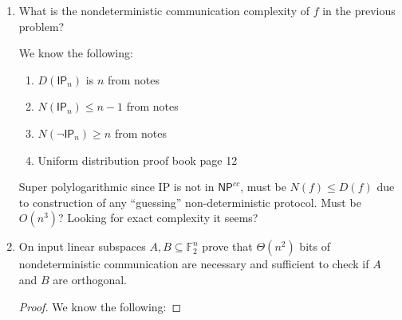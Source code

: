 \documentclass[usletter]{article}
\begin{document}
\begin{enumerate}
    \begin{proof}
      We know the following:

      \begin{enumerate}
        \item $M_{\mathsf{IP}_n} = \left [ \sum_{i=1}^{n} x_i y_i \right ]$ in $\mathbb{F}_2$
        \item $rk_{\mathbb{F}_2}\ M_{\mathsf{IP}_n} = n$
        \item $\forall \mathbb{F}, \mathbb{K}, rk_{\mathbb{F}}\ M = rk_{\mathbb{K}}\ M$ where $\mathbb{F}, \mathbb{K}$ are finite fields.
        \item $\forall \mathbb{F}, f.|fs(f)| \leq (1 + rk_{\mathbb{F}}\ M_f)^2$ where $M_f$ is the characteristic matrix for $f$.
      \end{enumerate}

      From the definition and (a) $f$ has can be seen as $\left [ \sum_{i=1}^{n} x_i y_i \right ]$ in $\mathbb{F}_{18181}$. Then by (b) and (c) we know that $M_f$ has rank $n$ and taken with (d) this implies that the size of the fooling set is certainly no greater than $n^3$.
    \end{proof}

  \item What is the nondeterministic communication complexity of $f$ in the previous problem?

    We know the following:

    \begin{enumerate}
      \item $D(\mathsf{IP}_n)$ is $n$ from notes
      \item $N(\mathsf{IP}_n) \leq n - 1$ from notes
      \item $N(\mathsf{\lnot IP}_n) \geq n$ from notes
      \item Uniform distribution proof book page 12
    \end{enumerate}

    Super polylogarithmic since IP is not in $\mathsf{NP}^{cc}$, must be  $N(f) \leq D(f)$ due to construction of any ``guessing'' non-deterministic protocol. Must be $O(n^3)$? Looking for exact complexity it seems?

  \item On input linear subspaces $A, B \subseteq \mathbb{F}_2^n$ prove that $\Theta(n^2)$ bits of nondeterministic communication are necessary and sufficient to check if $A$ and $B$ are orthogonal.

    \begin{proof}
      We know the following:


\end{proof}
\end{enumerate}
\end{document}
